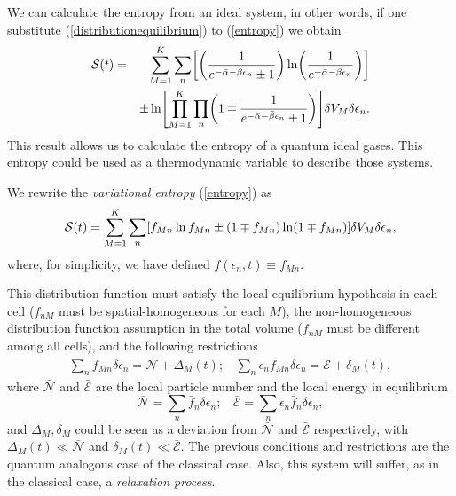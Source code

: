 We can calculate the entropy from an ideal system, in other words, if one
substitute (\ref{distributionequilibrium}) to (\ref{entropy}) we obtain
%
\begin{eqnarray}
      \Ss(t)&=&\sum_{M=1}^{K} \sum_n  \left[\left(\frac{1}{e^{-\bar{\alpha}-\bar{\beta}\epsilon_{n}}\pm 1} \right)\ln \left(\frac{1}{e^{-\bar{\alpha}-\bar{\beta}\epsilon_{n}}} \right) \right]\nonumber \\
      &&\pm  \ln \left[\prod_{M=1}^{K} \prod_{n}\left(1 \mp \frac{1}{e^{-\bar{\alpha}-\bar{\beta}\epsilon_{n}}\pm 1} \right) \right] \de V_M \delta \epsilon_n\label{H-entropy}.
  \end{eqnarray}
%
This result allows us to calculate the entropy of a quantum ideal gases. This
entropy could be used as a thermodynamic variable to describe those systems.
 
 
We rewrite the \textit{variational entropy} (\ref{entropy}) as
%
\begin{equation}
    \Ss(t)=\sum_{M=1}^{K} \sum_{n} \left[ f_{Mn} \ln f_{Mn} \pm (1 \mp f_{Mn}) \ln (1 \mp f_{Mn}) \right] \de V_M \delta \epsilon_n \label{entropy2},
\end{equation}
%
where, for simplicity, we have defined $f(\epsilon_{n},t)\equiv f_{Mn}$.

This distribution function must satisfy the local equilibrium hypothesis in
each cell ($f_{nM}$ must be spatial-homogeneous for each $M$), the
non-homogeneous distribution function assumption in the total volume ($f_{nM}$
must be different among all cells), and the following restrictions
%
\begin{eqnarray}
        \sum_{n}f_{Mn} \delta \epsilon_n=\bar{\mathcal{N}}+\Delta_M(t); \ \ \ \ \sum_{n}\epsilon_{n}f_{Mn} \delta \epsilon_n=\bar{\mathcal{E}}+ \delta_M(t), \label{restrictionoutside}
  \end{eqnarray}
%
where $\bar {\mathcal{N}}$ and $\bar{\mathcal{E}}$ are the local particle
number and the local energy in equilibrium
%
\begin{equation}
      \bar{\mathcal{N}}= \sum_n \bar{f}_n \delta \epsilon_n; \ \ \ \ \bar{\mathcal{E}}= \sum_n \epsilon_n\bar{f}_n \delta \epsilon_n,
  \end{equation}
%
and $\Delta_M,\delta_M$ could be seen as a deviation from $\bar{\mathcal{N}}$
and $\bar{\mathcal{E}}$ respectively, with $\Delta_M(t)\ll \bar{\mathcal{N}}$
and $\delta_M(t) \ll \bar{\mathcal{E}}$. The previous conditions and
restrictions are the quantum analogous case of the classical case. Also, this
system will suffer, as in the classical case, a \textit{relaxation process}.

